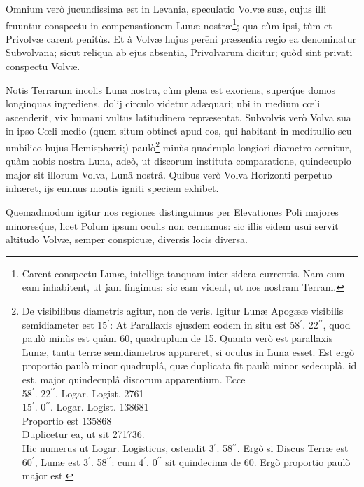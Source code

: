 \documentclass[a4paper, 11pt, oneside, polutonikogreek, german]{article}
\begin{document}
Omnium verò jucundissima est in Levania, speculatio Volvæ suæ, cujus illi fruuntur conspectu in compensationem Lunæ nostræ\footnote{Carent conspectu Lunæ, intellige tanquam inter sidera currentis. Nam cum eam inhabitent, ut jam fingimus: sic eam vident, ut nos nostram Terram.}; qua cùm ipsi, tùm et Privolvæ carent penitùs. Et à Volvæ hujus perēni præsentia regio ea denominatur Subvolvana; sicut reliqua ab ejus absentia, Privolvarum dicitur; quòd sint privati conspectu Volvæ.

Notis Terrarum incolis Luna nostra, cùm plena est exoriens, super\'que domos longinquas ingrediens, dolij circulo videtur adæquari; ubi in medium cœli ascenderit, vix humani vultus latitudinem repræsentat. Subvolvis verò Volva sua in ipso Cœli medio (quem situm obtinet apud eos, qui habitant in meditullio seu umbilico hujus Hemisphæri;) paulò\footnote{De visibilibus diametris agitur, non de veris. Igitur Lunæ Apogææ visibilis semidiameter est 15$^{\prime}$: At Parallaxis ejusdem eodem in situ est 58$^{\prime}$. 22$^{\prime\prime}$, quod paulò minùs est quàm 60, quadruplum de 15. Quanta verò est parallaxis Lunæ, tanta terræ semidiametros appareret, si oculus in Luna esset. Est ergò proportio paulò minor quadruplâ, quæ duplicata fit paulò minor sedecuplâ, id est, major quindecuplâ discorum apparentium. Ecce\\\hspace*{5mm}58$^{\prime}$. 22$^{\prime\prime}$. Logar. Logist. 2761\\\hspace*{5mm}15$^{\prime}$. 0$^{\prime\prime}$. Logar. Logist. 138681\\\hspace*{5mm}Proportio est 135868\\\hspace*{5mm}Duplicetur ea, ut sit 271736.\\\hspace*{5mm}Hic numerus ut Logar. Logisticus, ostendit 3$^{\prime}$. 58$^{\prime\prime}$. Ergò si Discus Terræ est 60$^{\prime}$, Lunæ est 3$^{\prime}$. 58$^{\prime\prime}$: cum 4$^{\prime}$. 0$^{\prime\prime}$ sit quindecima de 60. Ergò proportio paulò major est.} minùs quadruplo longiori diametro cernitur, quàm nobis nostra Luna, adeò, ut discorum instituta comparatione, quindecuplo major sit illorum Volva, Lunâ nostrâ. Quibus verò Volva Horizonti perpetuo inhæret, ijs eminus montis igniti speciem exhibet.

Quemadmodum igitur nos regiones distinguimus per Elevationes Poli majores minores\'que, licet Polum ipsum oculis non cernamus: sic illis eidem usui servit altitudo Volvæ, semper conspicuæ, diversis locis diversa.
\end{document}
